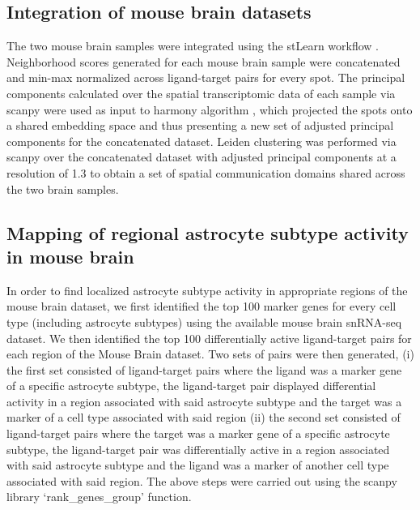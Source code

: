 \subsection*{Integration of mouse brain datasets}
The two mouse brain samples were integrated using the stLearn workflow \citep{Pham2020.05.31.125658}. Neighborhood scores generated for each mouse brain sample were concatenated and min-max normalized across ligand-target pairs for every spot. The principal components calculated over the spatial transcriptomic data of each sample via scanpy were used as input to harmony algorithm \citep{Korsunsky2019}, which projected the spots onto a shared embedding space and thus presenting a new set of adjusted principal components for the concatenated dataset. Leiden clustering was performed via scanpy over the concatenated dataset with adjusted principal components at a resolution of 1.3 to obtain a set of spatial communication domains shared across the two brain samples.


\subsection*{Mapping of regional astrocyte subtype activity in mouse brain}
In order to find localized astrocyte subtype activity in appropriate regions of the mouse brain dataset, we first identified the top 100 marker genes for every cell type (including astrocyte subtypes) using the available mouse brain snRNA-seq dataset. We then identified the top 100 differentially active ligand-target pairs for each region of the Mouse Brain dataset. Two sets of pairs were then generated, (i) the first set consisted of ligand-target pairs where the ligand was a marker gene of a specific astrocyte subtype, the ligand-target pair displayed differential activity in a region associated with said astrocyte subtype and the target was a marker of a cell type associated with said region (ii) the second set consisted of ligand-target pairs where the target was a marker gene of a specific astrocyte subtype, the ligand-target pair was differentially active in a region associated with said astrocyte subtype and the ligand was a marker of another cell type associated with said region. The above steps were carried out using the scanpy library `rank\_genes\_group' function.

